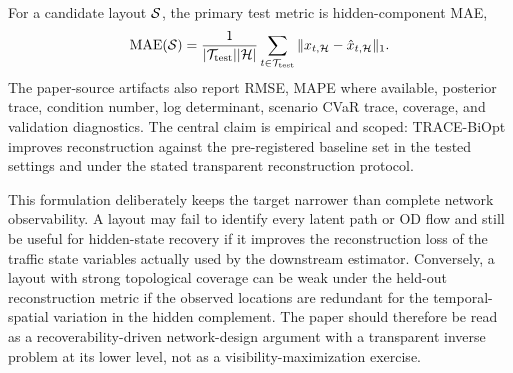 For a candidate layout $\mathcal{S}$, the primary test metric is hidden-component MAE,
\[
    \mathrm{MAE}(\mathcal{S})=\frac{1}{|\mathcal{T}_{\mathrm{test}}||\mathcal{H}|}
    \sum_{t\in\mathcal{T}_{\mathrm{test}}}\|x_{t,\mathcal{H}}-\hat{x}_{t,\mathcal{H}}\|_1.
\]
The paper-source artifacts also report RMSE, MAPE where available, posterior trace, condition number, log determinant, scenario CVaR trace, coverage, and validation diagnostics. The central claim is empirical and scoped: TRACE-BiOpt improves reconstruction against the pre-registered baseline set in the tested settings and under the stated transparent reconstruction protocol.

This formulation deliberately keeps the target narrower than complete network observability. A layout may fail to identify every latent path or OD flow and still be useful for hidden-state recovery if it improves the reconstruction loss of the traffic state variables actually used by the downstream estimator. Conversely, a layout with strong topological coverage can be weak under the held-out reconstruction metric if the observed locations are redundant for the temporal-spatial variation in the hidden complement. The paper should therefore be read as a recoverability-driven network-design argument with a transparent inverse problem at its lower level, not as a visibility-maximization exercise.
